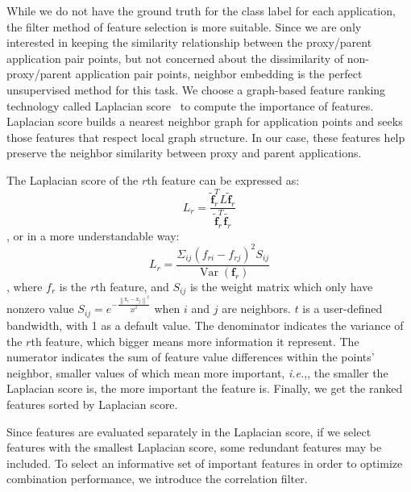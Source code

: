 \documentclass[conference]{IEEEtran}
\newcommand{\ie}                {\emph{i.e.},\xspace}
\begin{document}
While we do not have the ground truth for the class label for each application, the filter method of feature selection is more suitable. Since we are only interested in keeping the similarity relationship between the proxy/parent application pair points, but not concerned about the dissimilarity of non-proxy/parent application pair points, neighbor embedding is the perfect unsupervised method for this task. We choose a graph-based feature ranking technology called Laplacian score~\cite{he2005laplacian} to compute the importance of features.  Laplacian score builds a nearest neighbor graph for application points and seeks those features that respect local graph structure. In our case, these features help preserve the neighbor similarity between proxy and parent applications.  

The Laplacian score of the $r$th feature can be expressed as:
\begin{equation}L_{r}=\frac{\widetilde{\mathbf{f}}_{r}^{T} L \widetilde{\mathbf{f}}_{r}}{\widetilde{\mathbf{f}}_{r}^{T} \widetilde{\mathbf{f}_{r}}}
\end{equation}
, or in a more understandable way:
\begin{equation}
L_{r}=\frac{\Sigma_{i j}\left(f_{r i}-f_{r j}\right)^{2} S_{i j}}{\operatorname{Var}\left(\mathbf{f}_{r}\right)}
\end{equation} , where $f_r$ is the $r$th feature, and $S_{i j}$ is the weight matrix which only have nonzero value $S_{i j}=e^{-\frac{\left\|\mathrm{x}_{i}-\mathrm{x}_{j}\right\|^{2}}{2t^{2}}}$ when $i$ and $j$ are neighbors. $t$ is a user-defined bandwidth, with 1 as a default value. The denominator indicates the variance of the $r$th feature, which bigger means more information it represent. The numerator indicates the sum of feature value differences within the points' neighbor, smaller values of which mean more important, \ie, the smaller the Laplacian score is, the more important the feature is. Finally, we get the ranked features sorted by Laplacian score.

Since features are evaluated separately in the Laplacian score, if we select features with the smallest Laplacian score, some redundant features may be included. To select an informative set of important features in order to optimize combination performance, we introduce the correlation filter.
\end{document}
